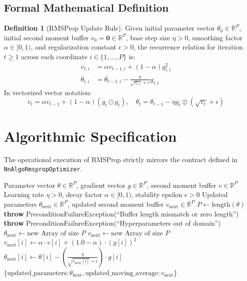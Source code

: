 \documentclass[11pt,a4paper]{article}
\theoremstyle{definition}
\newtheorem{definition}{Definition}[section]
\begin{document}
\subsection{Formal Mathematical Definition}
\begin{definition}[RMSProp Update Rule]
Given initial parameter vector $\theta_0 \in \mathbb{R}^P$, initial second moment buffer $v_0 = \mathbf{0} \in \mathbb{R}^P$, base step size $\eta > 0$, smoothing factor $\alpha \in [0, 1)$, and regularization constant $\epsilon > 0$, the recurrence relation for iteration $t \ge 1$ across each coordinate $i \in \{1, \dots, P\}$ is:
\begin{align}
v_{t, i} &= \alpha v_{t-1, i} + (1 - \alpha) g_{t, i}^2 \label{eq:rmsprop_v} \\
\theta_{t, i} &= \theta_{t-1, i} - \frac{\eta}{\sqrt{v_{t, i}} + \epsilon} g_{t, i} \label{eq:rmsprop_theta}
\end{align}
In vectorized vector notation:
\begin{equation}
v_t = \alpha v_{t-1} + (1 - \alpha)(g_t \odot g_t), \quad \theta_t = \theta_{t-1} - \eta g_t \oslash (\sqrt{v_t} + \epsilon)
\end{equation}
\end{definition}

\section{Algorithmic Specification}

The operational execution of RMSProp strictly mirrors the contract defined in \texttt{NnAlgoRmspropOptimizer}.

\begin{algorithm}[H]
\caption{Root Mean Square Propagation (RMSProp) Step Execution}
\begin{algorithmic}[1]
\Require Parameter vector $\theta \in \mathbb{R}^P$, gradient vector $g \in \mathbb{R}^P$, second moment buffer $v \in \mathbb{R}^P$
\Require Learning rate $\eta > 0$, decay factor $\alpha \in [0, 1)$, stability epsilon $\epsilon > 0$
\Ensure Updated parameters $\theta_{\text{next}} \in \mathbb{R}^P$, updated second moment buffer $v_{\text{next}} \in \mathbb{R}^P$
\State $P \gets \text{length}(\theta)$
    \State \textbf{throw} PreconditionFailureException(``Buffer length mismatch or zero length'')
\EndIf
{}
    \State \textbf{throw} PreconditionFailureException(``Hyperparameters out of domain'')
\EndIf
\State $\theta_{\text{next}} \gets \text{new Array of size } P$
\State $v_{\text{next}} \gets \text{new Array of size } P$
    \State $v_{\text{next}}[i] \gets \alpha \cdot v[i] + (1.0 - \alpha) \cdot (g[i])^2$
    \State $\theta_{\text{next}}[i] \gets \theta[i] - \left(\frac{\eta}{\sqrt{v_{\text{next}}[i]} + \epsilon}\right) \cdot g[i]$
\EndFor
\State \Return $\{\text{updated\_parameters}: \theta_{\text{next}}, \text{updated\_moving\_average}: v_{\text{next}}\}$
\end{algorithmic}
\end{algorithm}
\end{document}
